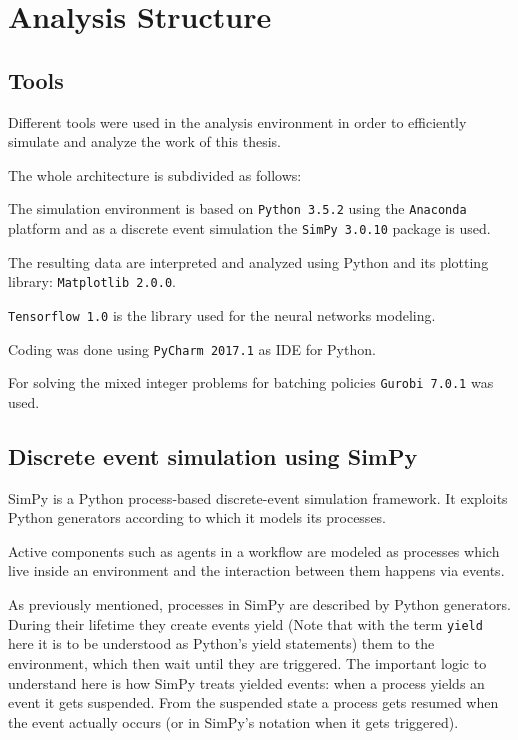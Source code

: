 \documentclass{seal_thesis}
\begin{document}
\section{Analysis Structure}
\subsection{Tools}
Different tools were used in the analysis environment in order to efficiently simulate and analyze the work of this thesis.

The whole architecture is subdivided as follows:
\begin{enumerate*}
	\item The simulation environment is based on \texttt{Python 3.5.2} using the \texttt{Anaconda} platform and as a discrete event simulation the \texttt{SimPy 3.0.10} package is used.
	\item The resulting data are interpreted and analyzed using Python and its plotting library: \texttt{Matplotlib 2.0.0}.
	\item \texttt{Tensorflow 1.0} is the library used for the neural networks modeling.
	\item Coding was done using \texttt{PyCharm 2017.1} as IDE for Python.
	\item For solving the mixed integer problems for batching policies \texttt{Gurobi 7.0.1} was used.
\end{enumerate*}

\subsection{Discrete event simulation using SimPy}
\label{subsec:discrete_event_sim}

SimPy is a Python process-based discrete-event simulation framework. It exploits Python generators according to which it models its processes.

Active components such as agents in a workflow are modeled as processes which live inside an environment and the interaction between them happens via events.

As previously mentioned, processes in SimPy are described by Python generators. During their lifetime they create events yield (Note that with the term \texttt{yield} here it is to be understood as Python's yield statements) them to the environment, which then wait until they are triggered. The important logic to understand here is how SimPy treats yielded events: when a process yields an event it gets suspended. From the suspended state a process gets resumed when the event actually occurs (or in SimPy's notation when it gets triggered).
\end{document}

